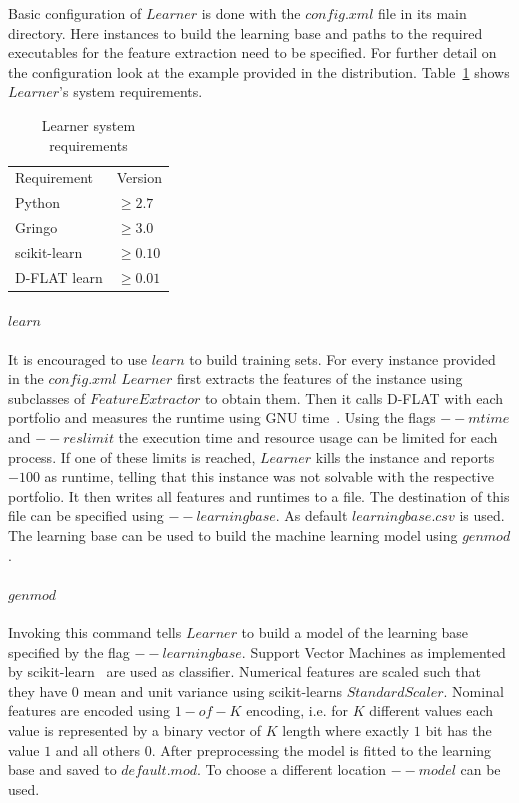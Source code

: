 Basic configuration of \inline$Learner$ is done with the \inline$config.xml$ file in its main directory. Here instances to build the learning base and paths to the required executables for the feature extraction need to be specified. For further detail on the configuration look at the example provided in the distribution. Table~\ref{tbl:req} shows \inline$Learner$'s system requirements.

\begin{table}[h]
	\center
	\begin{tabular}{ll}
		Requirement & Version\\
		Python & $\geq2.7$\\
		Gringo & $\geq3.0$\\
		scikit-learn & $\geq0.10$\\
		D-FLAT learn & $\geq0.01$
	\end{tabular}
	\caption{Learner system requirements \label{tbl:req}}
\end{table}

\paragraph{\inline$learn$}
It is encouraged to use \inline$learn$ to build training sets. For every instance provided in the \inline$config.xml$ \inline$Learner$ first extracts the features of the instance using subclasses of \inline$FeatureExtractor$ to obtain them. Then it calls \mbox{D-FLAT} with each portfolio and measures the runtime using GNU time~\cite{www:time}.
Using the flags \inline$--mtime$ and \inline$--reslimit$ the execution time and resource usage can be limited for each process. If one of these limits is reached, \inline$Learner$ kills the instance and reports $-100$ as runtime, telling that this instance was not solvable with the respective portfolio. It then writes all features and runtimes to a file. The destination of this file can be specified using \inline$--learningbase$. As default \inline$learningbase.csv$ is used. The learning base can be used to build the machine learning model using \inline$genmod$.

\paragraph{\inline$genmod$}
Invoking this command tells \inline$Learner$ to build a model of the learning base specified by the flag \inline$--learningbase$. Support Vector Machines as implemented by scikit-learn~\cite{www:scikit} are used as classifier. Numerical features are scaled such that they have $0$ mean and unit variance using scikit-learns \inline$StandardScaler$. 
Nominal features are encoded using \inline$1-of-K$ encoding, i.e. for $K$ different values each value is represented by a binary vector of $K$ length where exactly $1$ bit has the value $1$ and all others $0$.
After preprocessing the model is fitted to the learning base and saved to \inline$default.mod$. To choose a different location \inline$--model$ can be used.

